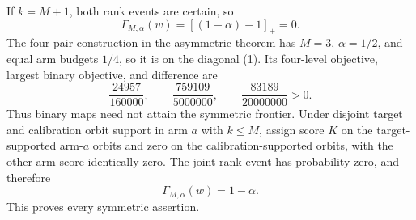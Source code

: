 If \(k=M+1\), both rank events are certain, so
\[
\Gamma_{M,\alpha}(w)=[(1-\alpha)-1]_+=0. \tag{11}
\]
The four-pair construction in the asymmetric theorem has \(M=3\), \(\alpha=1/2\), and equal arm budgets \(1/4\), so it is on the diagonal (1).  Its four-level objective, largest binary objective, and difference are
\[
\frac{24957}{160000},\qquad
\frac{759109}{5000000},\qquad
\frac{83189}{20000000}>0. \tag{12}
\]
Thus binary maps need not attain the symmetric frontier.  Under disjoint target and calibration orbit support in arm \(a\) with \(k\le M\), assign score \(K\) on the target-supported arm-\(a\) orbits and zero on the calibration-supported orbits, with the other-arm score identically zero.  The joint rank event has probability zero, and therefore
\[
\Gamma_{M,\alpha}(w)=1-\alpha. \tag{13}
\]
This proves every symmetric assertion.